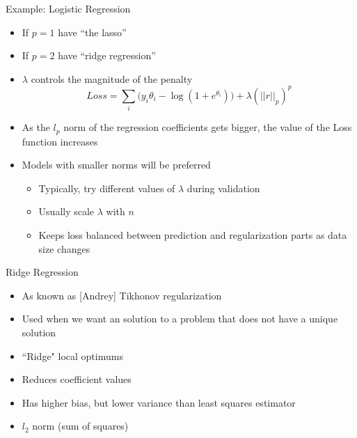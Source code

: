 \documentclass[aspectratio=169]{beamer}
\begin{document}

\begin{frame}{Example: Logistic Regression}
	\begin{itemize}
	\item If $p = 1$ have ``the lasso''
	\item If $p = 2$ have ``ridge regression''
	\item $\lambda$ controls the magnitude of the penalty
	$$Loss = \sum_i \big( y_i \theta_i - \log(1 + e^{\theta_i})\big) + \lambda (||r||_p)^p$$
	\item As the $l_p$ norm of the regression coefficients gets bigger, the value of the Loss function increases
	\item Models with smaller norms will be preferred
	\begin{itemize}
	\item Typically, try different values of $\lambda$ during validation
	\item Usually scale $\lambda$ with $n$ 
	\item Keeps loss balanced between prediction and regularization parts as data size changes
	\end{itemize}
\end{itemize}
\end{frame}

\begin{frame}{ Ridge Regression}
	\begin{itemize}
	\item As known as [Andrey] Tikhonov regularization
	\item Used when we want an solution to a problem that does not have a unique solution
	\item ``Ridge" local optimums
	\item Reduces coefficient values
	\item Has higher bias, but lower variance than least squares estimator
	\item $l_2$ norm (sum of squares)
\end{itemize}
\end{frame}
\end{document}
